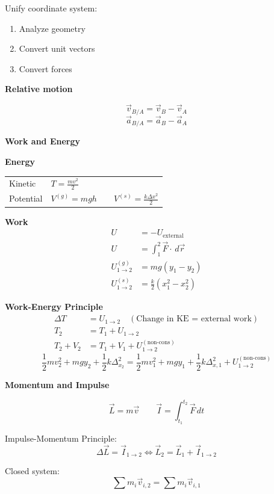 \documentclass[10pt]{article}
\newcommand\sectionheading[1]{\begin{center}\large{\textbf{#1}}\end{center}\normalsize}
\newcommand\heading[1]{\medskip\textbf{#1}\medskip}
\begin{document}
\begin{multicols*}{3}
Unify coordinate system:
\begin{enumerate}[itemsep=0pt]
    \item Analyze geometry
    \item Convert unit vectors 
    \item Convert forces
\end{enumerate}

\heading{Relative motion}

\[\vec v_{B/A}=\vec v_B-\vec v_A\]
\[\vec a_{B/A}=\vec a_B-\vec a_A\]

\newcolumn

\sectionheading{Work and Energy}

\heading{Energy}

\begin{tabular}{@{}ll}
    Kinetic & $T=\frac{mv^2}{2}$ \\
    Potential & $V^{(g)}=mgh \qquad V^{(s)}=\frac{k\Delta x^2}{2}$
\end{tabular}

\heading{Work}
\begin{align*}
    U &= -U_{\text{external}} \\
    U &= \int_1^2 \vec F\cdot\,d\vec{r} \\
    U_{1\rightarrow 2}^{(g)}&=mg(y_1-y_2) \\
    U_{1\rightarrow 2}^{(s)}&=\frac k2(x_1^2-x_2^2)
\end{align*}

\heading{Work-Energy Principle}
\begin{align*}
    \Delta T&=U_{1\rightarrow 2} \quad (\text{Change in KE = external work}) \\
    T_2 &= T_1+U_{1\rightarrow 2} \\
    T_2+V_2 &= T_1+V_1+U_{1\rightarrow 2}^{(\text{non-cons})}
\end{align*}
{\small \[\frac 12mv_2^2+mgy_2+\frac 12k\Delta_{x_2}^2=\frac 12mv_1^2+mgy_1+\frac 12k\Delta_{x,1}^2+U_{1\rightarrow 2}^{(\text{non-cons})}\]}

\heading{Momentum and Impulse}

\[\vec L=m\vec v \qquad \vec I=\int_{t_1}^{t_2}\vec F\,dt\]

Impulse-Momentum Principle:
\[\Delta \vec L=\vec I_{1\rightarrow 2} \iff \vec L_2=\vec L_1+\vec I_{1\rightarrow 2}\]

Closed system:
\[\sum m_i\vec v_{i,2}=\sum m_i\vec v_{i,1}\]

\end{multicols*}
\end{document}

